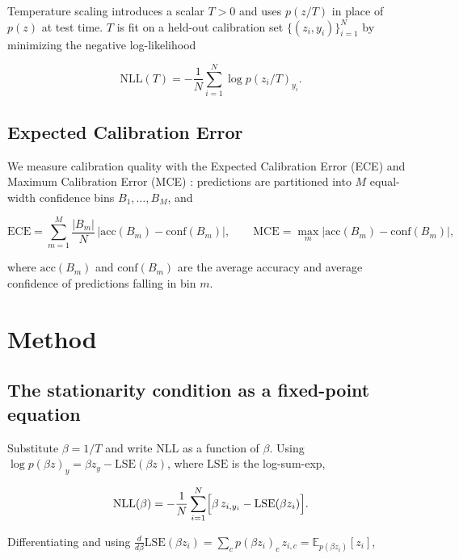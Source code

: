 \documentclass[11pt]{article}
\begin{document}
Temperature scaling introduces a scalar $T>0$ and uses
$p(z/T)$ in place of $p(z)$ at test time. $T$ is fit on a held-out
calibration set $\{(z_i, y_i)\}_{i=1}^N$ by minimizing the negative
log-likelihood

\begin{equation}
  \mathrm{NLL}(T) = -\frac{1}{N}\sum_{i=1}^N \log p(z_i / T)_{y_i}.
  \label{eq:nll}
\end{equation}

\subsection{Expected Calibration Error}

We measure calibration quality with the Expected Calibration Error
(ECE) and Maximum Calibration Error (MCE)
\citep{naeini2015obtaining,guo2017calibration}: predictions are
partitioned into $M$ equal-width confidence bins $B_1,\dots,B_M$, and

\begin{equation}
  \mathrm{ECE} = \sum_{m=1}^M \frac{|B_m|}{N}\,\bigl|\mathrm{acc}(B_m) - \mathrm{conf}(B_m)\bigr|,
  \qquad
  \mathrm{MCE} = \max_m \bigl|\mathrm{acc}(B_m) - \mathrm{conf}(B_m)\bigr|,
\end{equation}

where $\mathrm{acc}(B_m)$ and $\mathrm{conf}(B_m)$ are the average
accuracy and average confidence of predictions falling in bin $m$.

\section{Method}

\subsection{The stationarity condition as a fixed-point equation}

Substitute $\beta = 1/T$ and write $\mathrm{NLL}$ as a function of
$\beta$. Using $\log p(\beta z)_{y} = \beta z_y - \mathrm{LSE}(\beta z)$,
where $\mathrm{LSE}$ is the log-sum-exp,

\begin{equation}
  \mathrm{NLL}(\beta) = -\frac{1}{N}\sum_{i=1}^N
  \Bigl[\beta\, z_{i,y_i} - \mathrm{LSE}(\beta z_i)\Bigr].
\end{equation}

Differentiating and using $\frac{d}{d\beta}\mathrm{LSE}(\beta z_i) =
\sum_c p(\beta z_i)_c\, z_{i,c} = \mathbb{E}_{p(\beta z_i)}[z_i]$,
\end{document}
